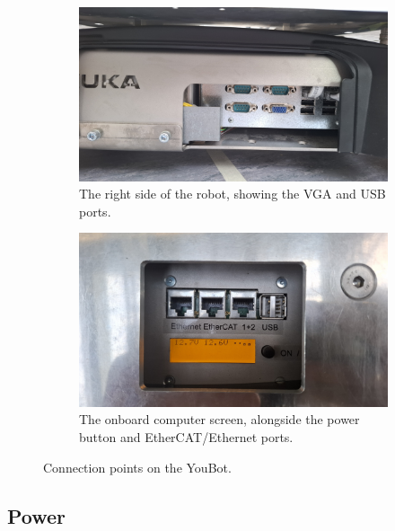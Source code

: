 \documentclass[a4paper, 12pt]{article}
\begin{document}
    \begin{figure}[H]
        \centering
        \begin{subfigure}[t]{0.49\linewidth}
            \centering
            \includegraphics[width=\linewidth]{images/sec2/youbot_usb_ports.jpg}
            \caption{The right side of the robot, showing the VGA and USB ports.}
            \label{fig:youbot-usb}
        \end{subfigure}
        \hfill
        \begin{subfigure}[t]{0.49\linewidth}
            \centering
            \includegraphics[width=\linewidth]{images/sec2/youbot_screen.jpg}
            \caption{The onboard computer screen, alongside the power button and EtherCAT/Ethernet ports.}
            \label{fig:youbot-screen}
        \end{subfigure}

        \caption{Connection points on the YouBot.}
        \label{fig:youbot-connections}
    \end{figure}


    \subsection{Power}
\end{document}
